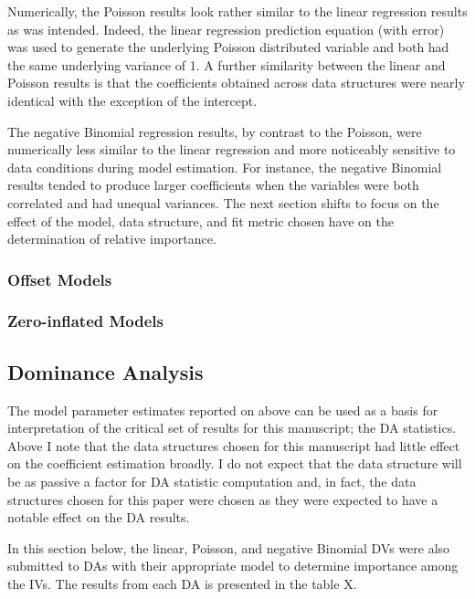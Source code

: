 \documentclass[ShortAfour,times,sageapa]{sagej}
\begin{document}
	
	
	Numerically, the Poisson results look rather similar to the linear regression results as was intended.  
	Indeed, the linear regression prediction equation (with error) was used to generate the underlying Poisson distributed variable and both had the same underlying variance of 1.
	A further similarity between the linear and Poisson results is that the coefficients obtained across data structures were nearly identical with the exception of the intercept.
	
	

	The negative Binomial regression results, by contrast to the Poisson, were numerically less similar to the linear regression and more noticeably sensitive to data conditions during model estimation.
	For instance, the negative Binomial results tended to produce larger coefficients when the variables were both correlated and had unequal variances.
	The next section shifts to focus on the effect of the model, data structure, and fit metric chosen have on the determination of relative importance.
	
		\subsubsection{Offset Models}
		
		\subsubsection{Zero-inflated Models}
	
	\subsection{Dominance Analysis}
	
	The model parameter estimates reported on above can be used as a basis for interpretation of the critical set of results for this manuscript; the DA statistics.
	Above I note that the data structures chosen for this manuscript had little effect on the coefficient estimation broadly.
	I do not expect that the data structure will be as passive a factor for DA statistic computation and, in fact, the data structures chosen for this paper were chosen as they were expected to have a notable effect on the DA results.
	
	In this section below, the linear, Poisson, and negative Binomial DVs were also submitted to DAs with their appropriate model to determine importance among the IVs.  
	The results from each DA is presented in the table X.
	
\end{document}
